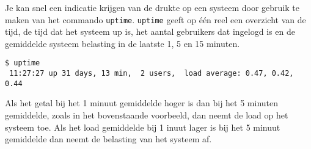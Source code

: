 Je kan snel een indicatie krijgen van de drukte op een systeem door gebruik te maken van het commando \texttt{uptime}. \texttt{uptime} geeft op \'e\'en reel een overzicht van de tijd, de tijd dat het systeem up is, het aantal gebruikers dat ingelogd is en de gemiddelde systeem belasting in de laatste 1, 5 en 15 minuten.

\begin{lstlisting}
$ uptime
 11:27:27 up 31 days, 13 min,  2 users,  load average: 0.47, 0.42, 0.44
\end{lstlisting}
Als het getal bij het 1 minuut gemiddelde hoger is dan bij het 5 minuten gemiddelde, zoals in het bovenstaande voorbeeld, dan neemt de load op het systeem toe. Als het load gemiddelde bij 1 inuut lager is bij het 5 minuut gemiddelde dan neemt de belasting van het systeem af.
